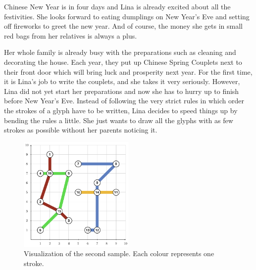 \problemname{}

%
Chinese New Year is in four days and Lina is already excited about all the festivities.
She looks forward to eating dumplings on New Year's Eve and setting off fireworks to greet the new year.
And of course, the money she gets in small red bags from her relatives is always a plus.

Her whole family is already busy with the preparations such as cleaning and decorating the house.
Each year, they put up Chinese Spring Couplets next to their front door which will bring luck and prosperity next year.
For the first time, it is Lina's job to write the couplets, and she takes it very seriously.
However, Lina did not yet start her preparations and now she has to hurry up to finish before New Year's Eve.
Instead of following the very strict rules in which order the strokes of a glyph have to be written, Lina decides to speed things up by bending the rules a little.
She just wants to draw all the glyphs with as few strokes as possible without her parents noticing it.


\begin{figure}[h]
	\centering
	\includegraphics[width=0.5\textwidth]{sample}
	\caption{Visualization of the second sample.
	Each colour represents one stroke.}
\end{figure}

